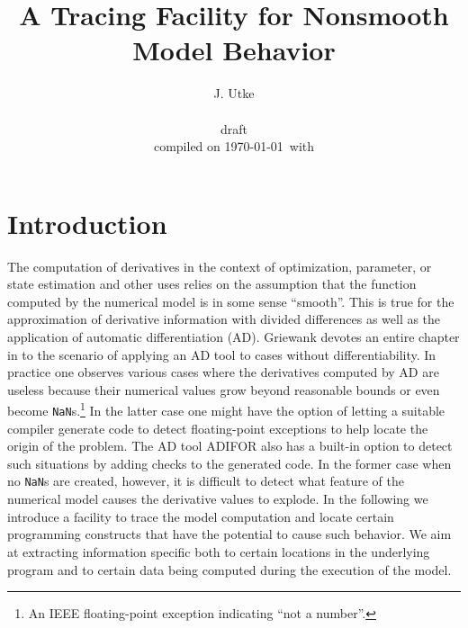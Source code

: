 \documentclass{article}
\title{A Tracing Facility for Nonsmooth Model Behavior}
\author{J. Utke\\\\
\scriptsize draft  \\  
\scriptsize compiled on \today\ with \\
\framebox{
\begin{minipage}{6.5cm}
\tiny

\end{minipage}
}
}
\date{ }
\begin{document}
\maketitle
{}
\lstset{basicstyle=\small\tt, 
	numbers=left, 
	numberstyle=\scriptsize,
  	stepnumber=1, 
	numbersep=10pt, 
	breaklines=true,
	resetmargins=false,
	xleftmargin=6ex,
	columns=fullflexible}
\section{Introduction}

The computation of derivatives in the context of optimization, parameter, or state estimation 
and other uses relies on the assumption that the function computed by the numerical 
model is in some sense ``smooth''. 
This is true for the approximation of derivative information with divided differences 
as well as the application of automatic differentiation (AD). 
Griewank devotes an entire chapter in \cite{Gri00} 
to the scenario of applying an AD tool to cases without differentiability. 
In practice one observes various cases where the derivatives computed by AD are useless 
because their numerical values grow  beyond reasonable bounds \cite{tfs-delayed,tfs-chain} or even 
become \lstinline{NaN}s.\footnote{
An IEEE floating-point exception indicating ``not a number''.
} 
In the latter case one might have the option of letting a suitable compiler generate 
code to detect floating-point exceptions to help locate the origin of the problem.
The AD  tool ADIFOR \cite{adiforWeb} also has a built-in  option to detect 
such situations by adding checks to the generated code.   
In the former case when no \lstinline{NaN}s are created, however, it is difficult to 
detect what feature of the numerical model causes the derivative values to explode. 
In the following we introduce a facility to trace the model computation and locate 
certain programming constructs that have the potential to cause 
such behavior. We aim at extracting information specific both  to 
certain locations in the underlying program and to certain data 
being computed during the execution of the model.  
   
\end{document}
